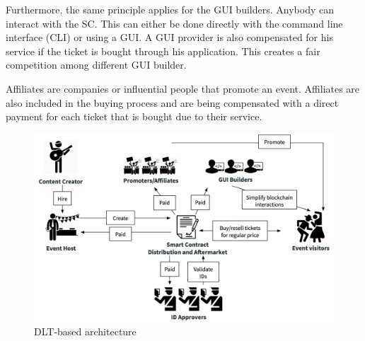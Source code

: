 Furthermore, the same principle applies for the GUI builders. Anybody can interact with the SC. This can either be done directly with the command line interface (CLI) or using a GUI. A GUI provider is also compensated for his service if the ticket is bought through his application. This creates a fair competition among different GUI builder.

Affiliates are companies or influential people that promote an event. Affiliates are also included in the buying process and are being compensated with a direct payment for each ticket that is bought due to their service. 


\begin{figure}[H]
    \centering
    \includegraphics[width=16cm]{figures/dlt-based-landscape.png}
    \caption{DLT-based architecture}
    \label{fig:dlt-based-landscape}
\end{figure}

